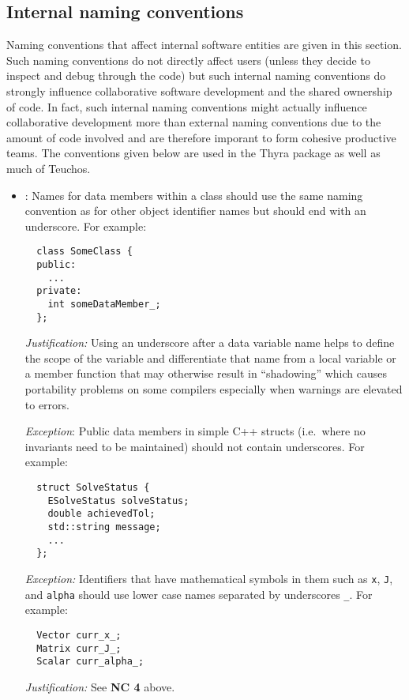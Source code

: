 %
\subsection{Internal naming conventions}
\label{sec:InternalNamingConventions}

Naming conventions that affect internal software entities are given in
this section.  Such naming conventions do not directly affect users
(unless they decide to inspect and debug through the code) but such
internal naming conventions do strongly influence collaborative
software development and the shared ownership of code.  In fact, such
internal naming conventions might actually influence collaborative
development more than external naming conventions due to the amount of
code involved and are therefore imporant to form cohesive productive
teams.  The conventions given below are used in the Thyra package as
well as much of Teuchos.


\begin{itemize}


{}\item\NCDataMemberNames: Names for data members within a class should use the
same naming convention as for other object identifier names but should end
with an underscore.  For example:

{\small\begin{verbatim}
  class SomeClass {
  public:
    ...
  private:
    int someDataMember_;
  };
\end{verbatim}}

{}\textit{Justification:} Using an underscore after a data variable
name helps to define the scope of the variable and differentiate that
name from a local variable or a member function that may otherwise
result in ``shadowing'' which causes portability problems on some
compilers especially when warnings are elevated to errors.

{}\textit{Exception}: Public data members in simple C++ structs (i.e.\
where no invariants need to be maintained) should not contain
underscores.  For example:

{\small\begin{verbatim}
  struct SolveStatus {
    ESolveStatus solveStatus;
    double achievedTol;
    std::string message;
    ...
  };
\end{verbatim}}

{}\textit{Exception:} Identifiers that have mathematical symbols in them such
as {}\texttt{x}, {}\texttt{J}, and {}\texttt{alpha} should use lower case
names separated by underscores {}\texttt{\_}.  For example:

{\small\begin{verbatim}
  Vector curr_x_;
  Matrix curr_J_;
  Scalar curr_alpha_;
\end{verbatim}}

{}\textit{Justification:} See {}\textbf{NC 4} above.


\end{itemize}


